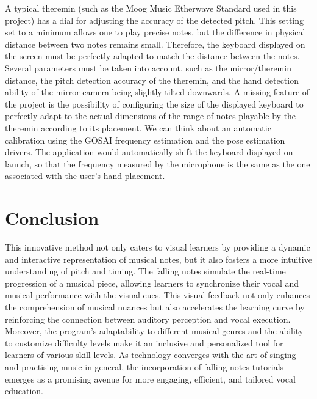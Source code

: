 A typical theremin (such as the Moog Music Etherwave Standard used in this project) has a dial for adjusting the accuracy of the detected pitch. This setting set to a minimum allows one to play precise notes, but the difference in physical distance between two notes remains small. Therefore, the keyboard displayed on the screen must be perfectly adapted to match the distance between the notes. Several parameters must be taken into account, such as the mirror/theremin distance, the pitch detection accuracy of the theremin, and the hand detection ability of the mirror camera being slightly tilted downwards. 
A missing feature of the project is the possibility of configuring the size of the displayed keyboard to perfectly adapt to the actual dimensions of the range of notes playable by the theremin according to its placement. We can think about an automatic calibration using the GOSAI frequency estimation and the pose estimation drivers. The application would automatically shift the keyboard displayed on launch, so that the frequency measured by the microphone is the same as the one associated with the user's hand placement.

\section{Conclusion}

This innovative method not only caters to visual learners by providing a dynamic and interactive representation of musical notes, but it also fosters a more intuitive understanding of pitch and timing. The falling notes simulate the real-time progression of a musical piece, allowing learners to synchronize their vocal and musical performance with the visual cues. 
This visual feedback not only enhances the comprehension of musical nuances but also accelerates the learning curve by reinforcing the connection between auditory perception and vocal execution. Moreover, the program's adaptability to different musical genres and the ability to customize difficulty levels make it an inclusive and personalized tool for learners of various skill levels. As technology converges with the art of singing and practising music in general, the incorporation of falling notes tutorials emerges as a promising avenue for more engaging, efficient, and tailored vocal education.